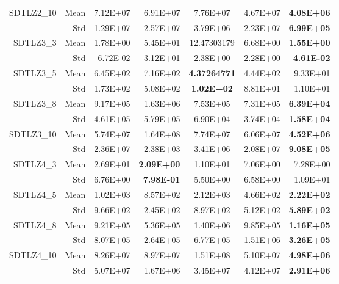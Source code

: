 \begin{table*}[htbp]
\begin{tabular}{rrrrrrr}
    \multirow{2}[0]{*}{SDTLZ2\_10} & Mean  & 7.12E+07 & 6.91E+07 & \multicolumn{1}{c}{7.76E+07} & 4.67E+07 & \textbf{4.08E+06} \\
          & Std   & 1.29E+07 & 2.57E+07 & \multicolumn{1}{c}{3.79E+06} & 2.23E+07 & \textbf{6.99E+05} \\
    \multirow{2}[0]{*}{SDTLZ3\_3} & Mean  & 1.78E+00 & 5.45E+01 & \multicolumn{1}{c}{12.47303179} & 6.68E+00 & \textbf{1.55E+00} \\
          & Std   & 6.72E-02 & 3.12E+01 & \multicolumn{1}{c}{2.38E+00} & 2.28E+00 & \textbf{4.61E-02} \\
    \multirow{2}[0]{*}{SDTLZ3\_5} & Mean  & 6.45E+02 & 7.16E+02 & \multicolumn{1}{c}{\textbf{4.37264771}} & 4.44E+02 & 9.33E+01 \\
          & Std   & 1.73E+02 & 5.08E+02 & \multicolumn{1}{c}{\textbf{1.02E+02}} & 8.81E+01 & 1.10E+01 \\
    \multirow{2}[0]{*}{SDTLZ3\_8} & Mean  & 9.17E+05 & 1.63E+06 & \multicolumn{1}{c}{7.53E+05} & 7.31E+05 & \textbf{6.39E+04} \\
          & Std   & 4.61E+05 & 5.79E+05 & \multicolumn{1}{c}{6.90E+04} & 3.74E+04 & \textbf{1.58E+04} \\
    \multirow{2}[0]{*}{SDTLZ3\_10} & Mean  & 5.74E+07 & 1.64E+08 & \multicolumn{1}{c}{7.74E+07} & 6.06E+07 & \textbf{4.52E+06} \\
          & Std   & 2.36E+07 & 2.38E+03 & \multicolumn{1}{c}{3.41E+06} & 2.08E+07 & \textbf{9.08E+05} \\
    \multirow{2}[0]{*}{SDTLZ4\_3} & Mean  & 2.69E+01 & \textbf{2.09E+00} & \multicolumn{1}{c}{1.10E+01} & 7.06E+00 & 7.28E+00 \\
          & Std   & 6.76E+00 & \textbf{7.98E-01} & \multicolumn{1}{c}{5.50E+00} & 6.58E+00 & 1.09E+01 \\
    \multirow{2}[0]{*}{SDTLZ4\_5} & Mean  & 1.02E+03 & 8.57E+02 & \multicolumn{1}{c}{2.12E+03} & 4.66E+02 & \textbf{2.22E+02} \\
          & Std   & 9.66E+02 & 2.45E+02 & \multicolumn{1}{c}{8.97E+02} & 5.12E+02 & \textbf{5.89E+02} \\
    \multirow{2}[0]{*}{SDTLZ4\_8} & Mean  & 9.21E+05 & 5.36E+05 & \multicolumn{1}{c}{1.40E+06} & 9.85E+05 & \textbf{1.16E+05} \\
          & Std   & 8.07E+05 & 2.64E+05 & \multicolumn{1}{c}{6.77E+05} & 1.51E+06 & \textbf{3.26E+05} \\
    \multirow{2}[0]{*}{SDTLZ4\_10} & Mean  & 8.26E+07 & 8.97E+07 & \multicolumn{1}{c}{1.51E+08} & 5.10E+07 & \textbf{4.98E+06} \\
          & Std   & 5.07E+07 & 1.67E+06 & \multicolumn{1}{c}{3.45E+07} & 4.12E+07 & \textbf{2.91E+06} \\
    \bottomrule
    \end{tabular}%
  \label{tab:SDTLZIGD}%
\end{table*}%
